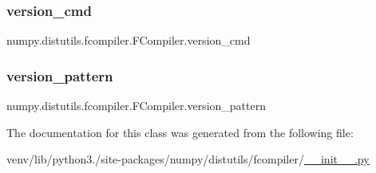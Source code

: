 \subsubsection{\texorpdfstring{version\+\_\+cmd}{version\_cmd}}
{\footnotesize\ttfamily numpy.\+distutils.\+fcompiler.\+F\+Compiler.\+version\+\_\+cmd\hspace{0.3cm}{\ttfamily [static]}}

\mbox{\label{classnumpy_1_1distutils_1_1fcompiler_1_1FCompiler_adb373b98d016dd6e623d11b96ecb65ee}} 
\subsubsection{\texorpdfstring{version\+\_\+pattern}{version\_pattern}}
{\footnotesize\ttfamily numpy.\+distutils.\+fcompiler.\+F\+Compiler.\+version\+\_\+pattern\hspace{0.3cm}{\ttfamily [static]}}



The documentation for this class was generated from the following file\+:\begin{DoxyCompactItemize}
\item 
venv/lib/python3./site-\/packages/numpy/distutils/fcompiler/\hyperlink{venv_2lib_2python3_89_2site-packages_2numpy_2distutils_2fcompiler_2____init_____8py}{\+\_\+\+\_\+init\+\_\+\+\_\+.\+py}\end{DoxyCompactItemize}
